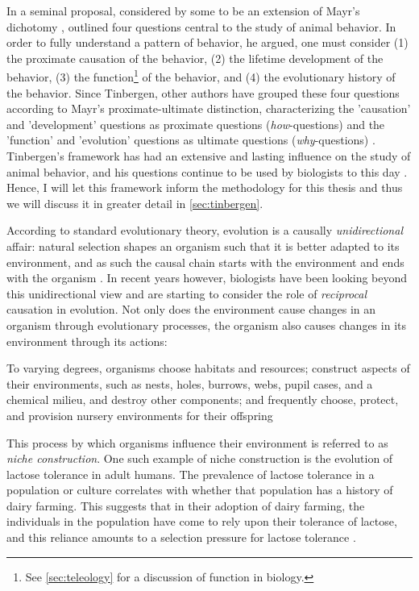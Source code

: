 In a seminal proposal, considered by some to be an extension of Mayr's dichotomy \citep{Laland13}, \citet{Tinbergen63} outlined four questions central to the study of animal behavior. In order to fully understand a pattern of behavior, he argued, one must consider (1) the proximate causation of the behavior, (2) the lifetime development of the behavior, (3) the function\footnote{See \cref{sec:teleology} for a discussion of function in biology.} of the behavior, and (4) the evolutionary history of the behavior.
Since Tinbergen, other authors have grouped these four questions according to Mayr's proximate-ultimate distinction, characterizing the 'causation' and 'development' questions as proximate questions (\emph{how}-questions) and the 'function' and 'evolution' questions as ultimate questions (\emph{why}-questions) \citep{BatesonLaland13, Laland13}.
Tinbergen's framework has had an extensive and lasting influence on the study of animal behavior, and his questions continue to be used by biologists to this day \citet{BatesonLaland13}. Hence, I will let this framework inform the methodology for this thesis and thus we will discuss it in greater detail in \cref{sec:tinbergen}.

According to standard evolutionary theory, evolution is a causally \emph{unidirectional} affair: natural selection shapes an organism such that it is better adapted to its environment, and as such the causal chain starts with the environment and ends with the organism \citep{Laland13}.
In recent years however, biologists have been looking beyond this unidirectional view and are starting to consider the role of \emph{reciprocal} causation in evolution. Not only does the environment cause changes in an organism through evolutionary processes, the organism also causes changes in its environment through its actions:
\begin{quoting}
    To varying degrees, organisms choose habitats and resources; construct aspects of their environments, such as nests, holes, burrows, webs, pupil cases, and a chemical milieu, and destroy other components; and frequently choose, protect, and provision nursery environments for their offspring
\hfill \citep[p.~81]{Day03}
\end{quoting}
This process by which organisms influence their environment is referred to as \emph{niche construction}.
One such example of niche construction is the evolution of lactose tolerance in adult humans. The prevalence of lactose tolerance in a population or culture correlates with whether that population has a history of dairy farming. This suggests that in their adoption of dairy farming, the individuals in the population have come to rely upon their tolerance of lactose, and this reliance amounts to a selection pressure for lactose tolerance \citep{S-P13}.

